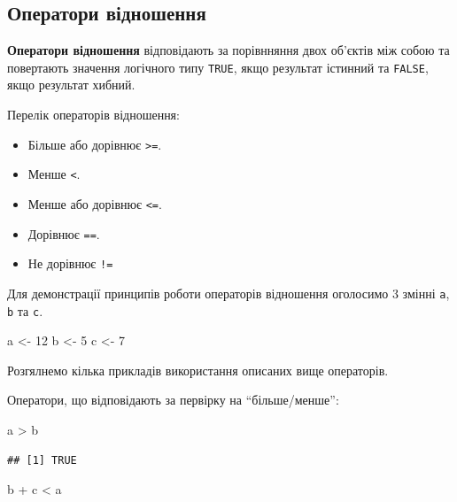 \documentclass[
]{book}
\newenvironment{Shaded}{\begin{snugshade}}{\end{snugshade}}
\newcommand{\DecValTok}[1]{\textcolor[rgb]{0.00,0.00,0.81}{#1}}
\newcommand{\NormalTok}[1]{#1}
\newcommand{\OtherTok}[1]{\textcolor[rgb]{0.56,0.35,0.01}{#1}}
\newcommand{\SpecialCharTok}[1]{\textcolor[rgb]{0.00,0.00,0.00}{#1}}
\providecommand{\tightlist}{%
  \setlength{\itemsep}{0pt}\setlength{\parskip}{0pt}}
\begin{document}
\hypertarget{chapter232}{%
\subsection{Оператори відношення}\label{chapter232}}

\textbf{Оператори відношення} відповідають за порівнняння двох об'єктів між собою та повертають значення логічного типу \texttt{TRUE}, якщо результат істинний та \texttt{FALSE}, якщо результат хибний.

Перелік операторів відношення:

\begin{itemize}
\tightlist
\item
  Більше або дорівнює \texttt{\textgreater{}=}.
\item
  Менше \texttt{\textless{}}.
\item
  Менше або дорівнює \texttt{\textless{}=}.
\item
  Дорівнює \texttt{==}.
\item
  Не дорівнює \texttt{!=}
\end{itemize}

Для демонстрації принципів роботи операторів відношення оголосимо 3 змінні \texttt{a}, \texttt{b} та \texttt{c}.

\begin{Shaded}
\begin{Highlighting}[]
\NormalTok{a }\OtherTok{\textless{}{-}} \DecValTok{12}
\NormalTok{b }\OtherTok{\textless{}{-}} \DecValTok{5}
\NormalTok{c }\OtherTok{\textless{}{-}} \DecValTok{7}
\end{Highlighting}
\end{Shaded}

Розгялнемо кілька прикладів використання описаних вище операторів.

Оператори, що відповідають за первірку на ``більше/менше'':

\begin{Shaded}
\begin{Highlighting}[]
\NormalTok{a }\SpecialCharTok{\textgreater{}}\NormalTok{ b}
\end{Highlighting}
\end{Shaded}

\begin{verbatim}
## [1] TRUE
\end{verbatim}

\begin{Shaded}
\begin{Highlighting}[]
\NormalTok{b }\SpecialCharTok{+}\NormalTok{ c }\SpecialCharTok{\textless{}}\NormalTok{ a}
\end{Highlighting}
\end{Shaded}
\end{document}
